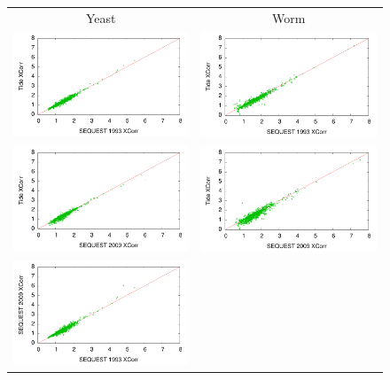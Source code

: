 \begin{figure}
\centering
\begin{tabular}{cc}
Yeast & Worm \\
\includegraphics[width=3in]{xcorr_xcorr_yeast_seqorig_tide.pdf} &
\includegraphics[width=3in]{xcorr_xcorr_worm_seqorig_tide.pdf} \\
\includegraphics[width=3in]{xcorr_xcorr_yeast_seqrecent_tide.pdf} &
\includegraphics[width=3in]{xcorr_xcorr_worm_seqrecent_tide.pdf} \\
\includegraphics[width=3in]{xcorr_xcorr_yeast_seqorig_seqrecent.pdf} &

\end{tabular}
\end{figure}
